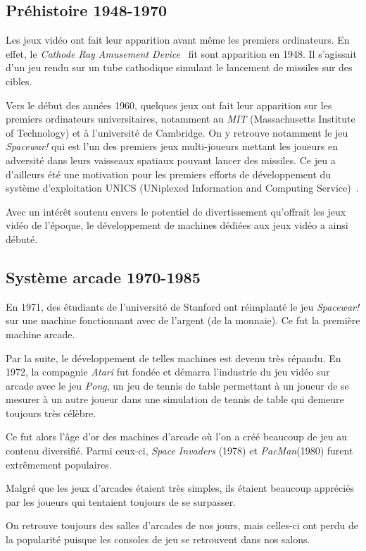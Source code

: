 \documentclass[12pt,twoside,letterpaper,francais]{book}
\newcommand{\si}{{\textit{Space Invaders }}}
\begin{document}
\FloatBarrier
\subsection{Préhistoire 1948-1970}
Les jeux vidéo ont fait leur apparition avant même les premiers
ordinateurs. En effet, le \textit{Cathode Ray Amusement
  Device}~\cite{CRTAD} fit sont apparition en 1948. Il s'agissait d'un
jeu rendu sur un tube cathodique simulant le lancement de missiles sur
des cibles.

Vers le début des années 1960, quelques jeux ont fait leur apparition
sur les premiers ordinateurs universitaires, notamment au \textit{MIT}
(Massachusetts Institute of Technology) et à l'université de
Cambridge. On y retrouve notamment le jeu \textit{Spacewar!} qui est
l'un des premiers jeux multi-joueurs mettant les joueurs en adversité
dans leurs vaisseaux spatiaux pouvant lancer des missiles. Ce jeu a
d'ailleurs été une motivation pour les premiers efforts de
développement du système d'exploitation UNICS (UNiplexed Information
and Computing Service)~\cite{SPACEWAR-UNICS}.

Avec un intérêt soutenu envers le potentiel de divertissement
qu'offrait les jeux vidéo de l'époque, le développement de machines
dédiées aux jeux vidéo a ainsi débuté.


\FloatBarrier
\subsection{Système arcade 1970-1985}
En 1971, des étudiants de l'université de Stanford ont réimplanté le
jeu \textit{Spacewar!} sur une machine fonctionnant avec de l'argent
(de la monnaie). Ce fut la première machine arcade.

Par la suite, le développement de telles machines est devenu très
répandu. En 1972, la compagnie \textit{Atari} fut fondée et démarra
l'industrie du jeu vidéo sur arcade avec le jeu \textit{Pong}, un jeu
de tennis de table permettant à un joueur de se mesurer à un autre
joueur dans une simulation de tennis de table qui demeure toujours
très célèbre.

Ce fut alors l'âge d'or des machines d'arcade où l'on a créé beaucoup
de jeu au contenu diversifié. Parmi ceux-ci, \si(1978) et
\textit{PacMan}(1980) furent extrêmement populaires.

Malgré que les jeux d'arcades étaient très simples, ils étaient
beaucoup appréciés par les joueurs qui tentaient toujours de se
surpasser.

On retrouve toujours des salles d'arcades de nos jours, mais celles-ci
ont perdu de la popularité puisque les consoles de jeu se
retrouvent dans nos salons.
\end{document}
